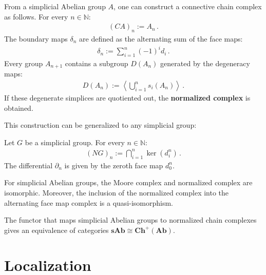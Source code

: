     \begin{construct}
        From a simplicial Abelian group $A$, one can construct a connective chain complex as follows. For every $n\in\mathbb{N}$:
        \begin{gather}
            (CA)_n := A_n\,.
        \end{gather}
        The boundary maps $\delta_n$ are defined as the alternating sum of the face maps:
        \begin{gather}
            \delta_n := \sum_{i=1}^n(-1)^id_i\,.
        \end{gather}
        Every group $A_{n+1}$ contains a subgroup $D(A_n)$ generated by the degeneracy maps:
        \begin{gather}
            D(A_n) := \left\langle\bigcup_{i=1}^ns_i(A_n)\right\rangle\,.
        \end{gather}
        If these degenerate simplices are quotiented out, the \textbf{normalized complex} is obtained.
    \end{construct}
    This construction can be generalized to any simplicial group:
    \begin{construct}
        Let $G$ be a simplicial group. For every $n\in\mathbb{N}$:
        \begin{gather}
            (NG)_n := \bigcap_{i=1}^n\ker(d^n_i)\,.
        \end{gather}
        The differential $\partial_n$ is given by the zeroth face map $d^n_0$.
    \end{construct}
    \begin{property}[Equivalence]
        For simplicial Abelian groups, the Moore complex and normalized complex are isomorphic. Moreover, the inclusion of the normalized complex into the alternating face map complex is a quasi-isomorphism.
    \end{property}

    \begin{theorem}\label{model:dold_kan}
        The functor that maps simplicial Abelian groups to normalized chain complexes gives an equivalence of categories $\mathbf{sAb}\cong\mathbf{Ch}^+(\mathbf{Ab})$.
    \end{theorem}

\section{Localization}

